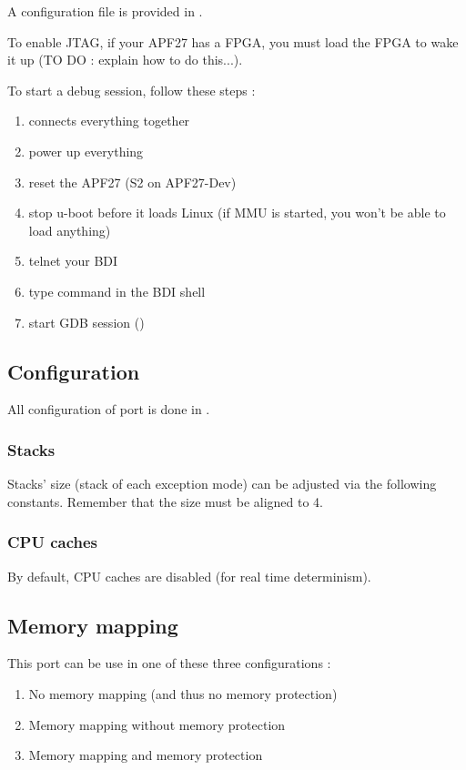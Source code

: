 A configuration file is provided in .

To enable JTAG, if your APF27 has a FPGA, you must load the FPGA to wake it up (TO DO : explain how to do this...).

To start a debug session, follow these steps :
\begin{enumerate}
\item connects everything together
\item power up everything
\item reset the APF27 (S2 on APF27-Dev)
\item stop u-boot before it loads Linux (if MMU is started, you won't be able to load anything)
\item telnet your BDI
\item type  command in the BDI shell
\item start GDB session ()
\end{enumerate}

\subsection{Configuration}

All configuration of port is done in .

\subsubsection{Stacks}

Stacks' size (stack of each exception mode) can be adjusted via the following constants. Remember that the size must be aligned to 4.

\subsubsection{CPU caches}

By default, CPU caches are disabled (for real time determinism).

\subsection{Memory mapping}

This port can be use in one of these three configurations :
\begin{enumerate}
\item No memory mapping (and thus no memory protection)
\item Memory mapping without memory protection
\item Memory mapping and memory protection
\end{enumerate}

